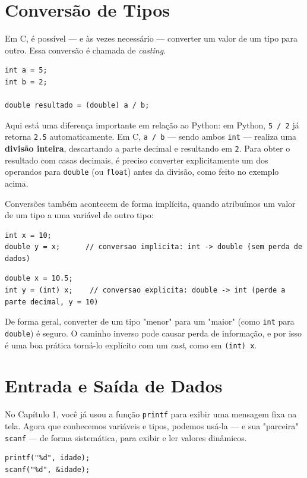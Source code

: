 \documentclass[12pt,a4paper,oneside]{extreport}
\begin{document}
\section{Conversão de Tipos}
Em C, é possível — e às vezes necessário — converter um valor de um tipo para outro. Essa conversão é chamada de \textit{casting}.

\begin{lstlisting}
int a = 5;
int b = 2;

double resultado = (double) a / b;
\end{lstlisting}

Aqui está uma diferença importante em relação ao Python: em Python, \texttt{5 / 2} já retorna \texttt{2.5} automaticamente. Em C, \texttt{a / b} — sendo ambos \texttt{int} — realiza uma \textbf{divisão inteira}, descartando a parte decimal e resultando em \texttt{2}. Para obter o resultado com casas decimais, é preciso converter explicitamente um dos operandos para \texttt{double} (ou \texttt{float}) antes da divisão, como feito no exemplo acima.

Conversões também acontecem de forma implícita, quando atribuímos um valor de um tipo a uma variável de outro tipo:

\begin{lstlisting}
int x = 10;
double y = x;      // conversao implicita: int -> double (sem perda de dados)
\end{lstlisting}

\begin{lstlisting}
double x = 10.5;
int y = (int) x;    // conversao explicita: double -> int (perde a parte decimal, y = 10)
\end{lstlisting}

De forma geral, converter de um tipo "menor" para um "maior" (como \texttt{int} para \texttt{double}) é seguro. O caminho inverso pode causar perda de informação, e por isso é uma boa prática torná-lo explícito com um \textit{cast}, como em \texttt{(int) x}.

\section{Entrada e Saída de Dados}
No Capítulo 1, você já usou a função \texttt{printf} para exibir uma mensagem fixa na tela. Agora que conhecemos variáveis e tipos, podemos usá-la — e sua "parceira" \texttt{scanf} — de forma sistemática, para exibir e ler valores dinâmicos.

\begin{lstlisting}
printf("%d", idade);
scanf("%d", &idade);
\end{lstlisting}
\end{document}
